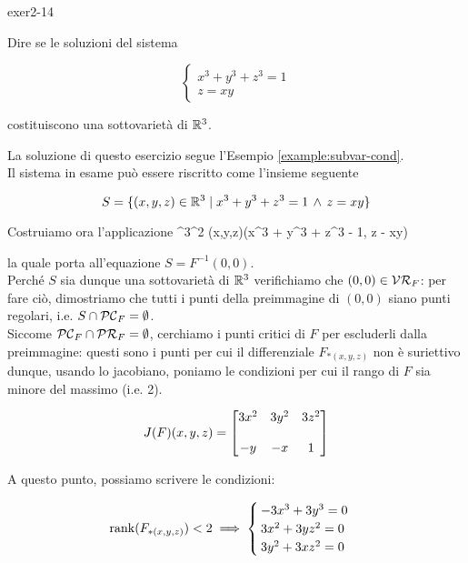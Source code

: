
{exer2-14}
{
Dire se le soluzioni del sistema

\begin{equation}
	\begin{cases}
		x^{3} + y^{3} + z^{3} = 1 \\
		z = xy
	\end{cases}
\end{equation}

costituiscono una sottovarietà di $ \mathbb{R}^{3} $.
}
{
La soluzione di questo esercizio segue l'Esempio \ref{example:subvar-cond}. \\
Il sistema in esame può essere riscritto come l'insieme seguente

\begin{equation}
	S = \{ (x,y,z) \in \mathbb{R}^{3} \mid x^{3} + y^{3} + z^{3} = 1 \, \wedge \, z = xy \}
\end{equation}

Costruiamo ora l'applicazione
%
	{\R^{3}}{\R^{2}}
	{(x,y,z)}{(x^{3} + y^{3} + z^{3} - 1, z - xy)}

la quale porta all'equazione $ S = F^{-1}(0,0) $. \\
Perché $ S $ sia dunque una sottovarietà di $ \mathbb{R}^{3} $ verifichiamo che $ (0,0) \in \mathcal{VR}_{F} $: per fare ciò, dimostriamo che tutti i punti della preimmagine di $ (0,0) $ siano punti regolari, i.e. $ S \cap \mathcal{PC}_{F} = \emptyset $. \\
Siccome $ \mathcal{PC}_{F} \cap \mathcal{PR}_{F} = \emptyset $, cerchiamo i punti critici di $ F $ per escluderli dalla preimmagine: questi sono i punti per cui il differenziale $ F_{*(x,y,z)} $  non è suriettivo dunque, usando lo jacobiano, poniamo le condizioni per cui il rango di $ F $ sia minore del massimo (i.e. 2).

\begin{equation}
	J(F)(x,y,z) = \bmqty{ %
							3 x^{2} & 3 y^{2} & 3 z^{2} \\ \\
							- y 	& - x	  & 1 %
							}
\end{equation}

A questo punto, possiamo scrivere le condizioni:

\begin{equation}
	\rank(F_{*(x,y,z)}) < 2 %
	\implies %
	\begin{cases}
		- 3 x^{3} + 3 y^{3} = 0 \\
		3 x^{2} + 3 y z^{2} = 0 \\
		3 y^{2} + 3 x z^{2} = 0
	\end{cases}
\end{equation}

}
